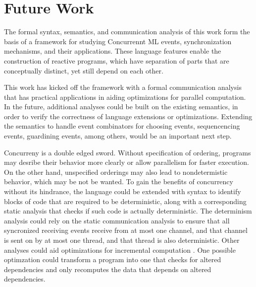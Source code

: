\documentclass[letterpaper, 11pt]{report}
\begin{document}
\section{Future Work}
The formal syntax, semantics, and communication analysis of this work form the basis of
a framework for studying Concurrennt ML events, synchronization mechanisms, and their
applications. These language features enable the construction of reactive programs, which
have separation of parts that are conceptually distinct, yet still depend on each
other.

This work has kicked off the framework with a formal communication analysis that has practical
applications in aiding optimizations for parallel computation. In the future, additional
analyses could be built on the existing semantics, in order to verify the correctness of language 
extensions or optimizations. Extending the semantics to handle event combinators for choosing
events, sequencencing events, guardining events, among others, would be an important next step.

Concurreny is a double edged sword. Without specification of ordering, programs may
desribe their behavior more clearly or allow parallelism for faster execution. On the other hand,
unspecified orderings may also lead to nondetermistic behavior, which may be not be wanted. 
To gain the benefits of concurrency without its hindrance, the language could be extended
with syntax to identify blocks of code that are required to be deterministic,
along with a corresponding static analysis that checks if such code is actually
deterministic. The determinism analysis could rely on the static communication analysis
to ensure that all syncronized receiving events receive from at most one channel,
and that channel is sent on by at most one thread, and that thread is also deterministic.
Other analyses could aid optimizations for incremental computation
\cite{acar2002adaptive}. One possible optimzation could transform a program into one
that checks for altered dependencies and only recomputes the data that depends on altered dependencies.

\newpage



\end{document}
